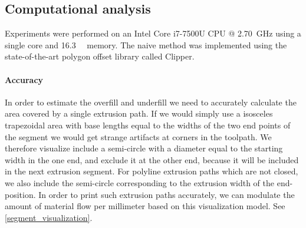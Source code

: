 \subsection{Computational analysis}
Experiments were performed on an Intel Core i7-7500U CPU @ \SI{2.70}{\giga\hertz} using a single core and \SI{16.3}{\giga\byte} memory.
The naive method was implemented using the state-of-the-art polygon offset library called Clipper. \cite{johnson2014clipper}

\paragraph{Accuracy}
In order to estimate the overfill and underfill we need to accurately calculate the area covered by a single extrusion path.
If we would simply use a isosceles trapezoidal area with base lengths equal to the widths of the two end points of the segment we would get strange artifacts at corners in the toolpath.
We therefore visualize include a semi-circle with a diameter equal to the starting width in the one end, and exclude it at the other end, because it will be included in the next extrusion segment.
For polyline extrusion paths which are not closed, we also include the semi-circle corresponding to the extrusion width of the end-position.
In order to print such extrusion paths accurately, we can modulate the amount of material flow per millimeter based on this visualization model.
See \cref{segment_visualization}.

